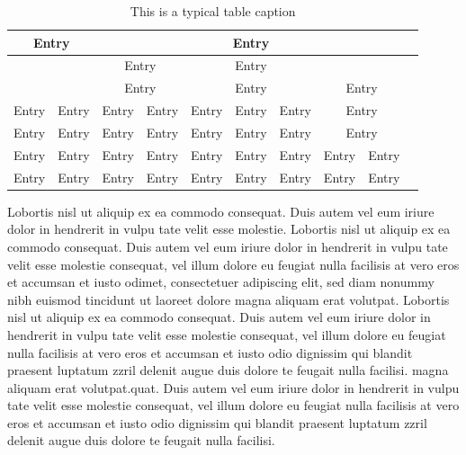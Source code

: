 \documentclass[a4paper, oneside, twocolumn, notitlepage, 10pt]{extarticle_ecoc}
\begin{document}
\begin{table}[t]
   \centering
\caption{This is a typical table caption}
\label{tab:table2}%
      \begin{tabular}{|l|r|r|c|c|c|c|c|r|r|}
         \hline  \multicolumn{2}{|c|}{\textbf{Entry}}  &  \multicolumn{7}{|c|}{\textbf{Entry}} \\
         \hline  \multicolumn{2}{|c|}{ }  &  \multicolumn{2}{|c|}{Entry}  &  \multicolumn{3}{|c|}{Entry}  &  \multicolumn{2}{|c|}{ }  \\
         \multicolumn{2}{|c|}{ }  &  \multicolumn{2}{|c|}{Entry}  &  \multicolumn{3}{|c|}{Entry}  &  \multicolumn{2}{|c|}{Entry} \\
         \hline Entry  &  Entry   &   Entry &  Entry   &  Entry  &  Entry  &  Entry  &  \multicolumn{2}{|c|}{Entry} \\
         \hline Entry  &  Entry  &  Entry &  Entry  &  Entry  &  Entry   & Entry  &  \multicolumn{2}{|c|}{Entry} \\
         \hline  Entry    &   Entry    &  Entry    &  Entry   &   Entry    &   Entry  &      Entry  &    Entry   &  Entry      \\
         \hline  Entry  &   Entry  &  Entry  &  Entry      &  Entry    &   Entry   &     Entry  &   Entry   &  Entry  \\
         \hline
      \end{tabular}
\end{table}

Lobortis nisl ut aliquip ex ea commodo consequat. Duis autem vel eum
iriure dolor in hendrerit in vulpu tate velit esse molestie.
Lobortis nisl ut aliquip ex ea commodo consequat. Duis autem vel eum
iriure dolor in hendrerit in vulpu tate velit esse molestie
consequat, vel illum dolore eu feugiat nulla facilisis at vero eros
et accumsan et iusto odimet, consectetuer adipiscing elit, sed diam
nonummy nibh euismod tincidunt ut laoreet dolore magna aliquam erat
volutpat. Lobortis nisl ut aliquip ex ea commodo consequat. Duis
autem vel eum iriure dolor in hendrerit in vulpu tate velit esse
molestie consequat, vel illum dolore eu feugiat nulla facilisis at
vero eros et accumsan et iusto odio dignissim qui blandit praesent
luptatum zzril delenit augue duis dolore te feugait nulla facilisi.
magna aliquam erat volutpat.quat. Duis autem vel eum iriure dolor in
hendrerit in vulpu tate velit esse molestie consequat, vel illum
dolore eu feugiat nulla facilisis at vero eros et accumsan et iusto
odio dignissim qui blandit praesent luptatum zzril delenit augue
duis dolore te feugait nulla facilisi.
\end{document}
